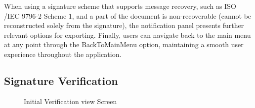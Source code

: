 \documentclass[]{final_report}
\theoremstyle{definition}
\begin{document}
When using a signature scheme that supports message recovery, such as ISO \slash IEC 9796-2 Scheme 1, and a part of the document is non-recoverable (cannot be reconstructed solely from the signature), the notification panel presents further relevant options for exporting.
Finally, users can navigate back to the main menu at any point through the BackToMainMenu option, maintaining a smooth user experience throughout the application.

\subsection{Signature Verification}

\begin{figure}[H]
    \centering %
    
    \begin{minipage}{0.49\textwidth}
        \centering
        \caption{Initial Verification view Screen}
        \label{fig:image1}
    \end{minipage}
    \hfill %
    \begin{minipage}{0.49\textwidth}
        \centering

\end{minipage}
\end{figure}
\end{document}
